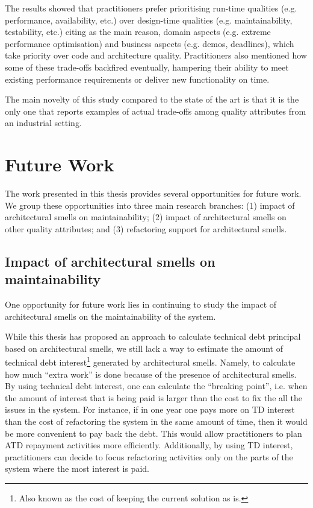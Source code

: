 The results showed that practitioners prefer prioritising run-time qualities (e.g. performance, availability, etc.) over design-time qualities (e.g. maintainability, testability, etc.) citing as the main reason, domain aspects (e.g. extreme performance optimisation) and business aspects (e.g. demos, deadlines), which take priority over code and architecture quality.
Practitioners also mentioned how some of these trade-offs backfired eventually, hampering their ability to meet existing performance requirements or deliver new functionality on time. 

The main novelty of this study compared to the state of the art is that it is the only one that reports examples of actual trade-offs among quality attributes from an industrial setting.

\section{Future Work}\label{c8:sec:future-work}
The work presented in this thesis provides several opportunities for future work.
We group these opportunities into three main research branches:
(1) impact of architectural smells on maintainability; (2) impact of architectural smells on other quality attributes; and (3) refactoring support for architectural smells.


\subsection{Impact of architectural smells on maintainability}
One opportunity for future work lies in continuing to study the impact of architectural smells on the maintainability of the system.

While this thesis has proposed an approach to calculate technical debt principal based on architectural smells, we still lack a way to estimate the amount of technical debt interest\footnote{Also known as the cost of keeping the current solution as is.} generated by architectural smells.
Namely, to calculate how much ``extra work'' is done because of the presence of architectural smells.
By using technical debt interest, one can calculate the ``breaking point'', i.e. when the amount of interest that is being paid is larger than the cost to fix the all the issues in the system.
For instance, if in one year one pays more on TD interest than the cost of refactoring the system in the same amount of time, then it would be more convenient to pay back the debt.
This would allow practitioners to plan ATD repayment activities more efficiently.
Additionally, by using TD interest, practitioners can decide to focus refactoring activities only on the parts of the system where the most interest is paid.

